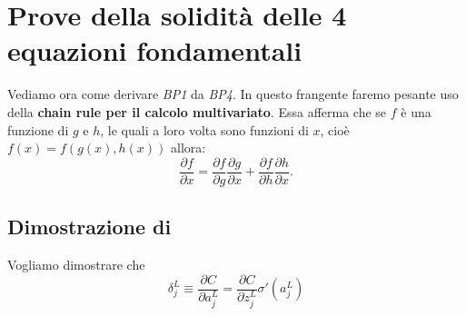 \section{Prove della solidità delle 4 equazioni fondamentali}
Vediamo ora come derivare \textit{BP1} da \textit{BP4}. In questo frangente faremo pesante uso della \textbf{chain rule per il calcolo multivariato}. Essa afferma che se $f$ è una funzione di $g$ e $h$, le quali a loro volta sono funzioni di $x$, cioè $f(x)=f(g(x),h(x))$ allora:
\begin{equation}
    \frac{\partial f}{\partial x} = \frac{\partial f}{\partial g} \frac{\partial g}{\partial x} + \frac{\partial f}{\partial h} \frac{\partial h}{\partial x}.
\end{equation}
\subsection{Dimostrazione di }
Vogliamo dimostrare che
\begin{equation}
    \delta^L_j \equiv \frac{\partial C}{\partial a^L_j} = 
    \frac{\partial C}{\partial z^L_j}\sigma'(a^L_j)
\end{equation}
